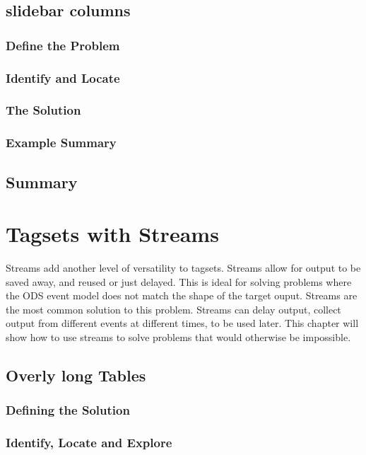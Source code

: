\documentclass{book}
\begin{document}
\section{slidebar columns}

\subsection{Define the Problem}

\subsection{Identify and Locate}

\subsection{The Solution}

\subsection{Example Summary}

\section{Summary}

\chapter{Tagsets with Streams}
Streams add another level of versatility to tagsets.  
Streams allow for output to be saved away, and reused or
just delayed.  This is ideal for solving problems where
the ODS event model does not match the shape of the target
ouput. Streams are the most common solution to this problem.
Streams can delay output, collect output from different events
at different times, to be used later.
This chapter will show how to use streams to solve problems
that would otherwise be impossible.
\section{Overly long Tables}

\subsection{Defining the Solution}

\subsection{Identify, Locate and Explore}
\end{document}

